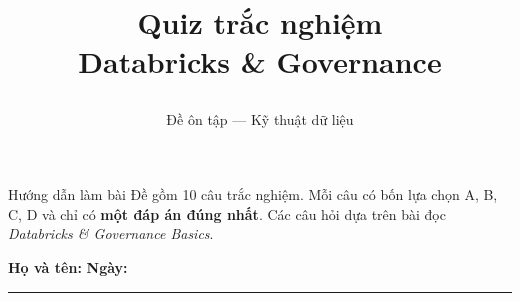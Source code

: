 
\title{\parbox[c][\TitleBlockHeight][c]{0.90\textwidth}{\centering\fontsize{20pt}{24pt}\selectfont\bfseries Quiz trắc nghiệm\\Databricks \& Governance}}
\author{Đề ôn tập --- Kỹ thuật dữ liệu}

\maketitle
\thispagestyle{firstpage}
\vspace{-1em}
\begin{infobox}{Hướng dẫn làm bài}
Đề gồm 10 câu trắc nghiệm. Mỗi câu có bốn lựa chọn A, B, C, D và chỉ có \textbf{một đáp án đúng nhất}. Các câu hỏi dựa trên bài đọc \emph{Databricks \& Governance Basics}.
\end{infobox}
\noindent\textbf{Họ và tên:} \dotfill\quad\textbf{Ngày:} \rule{2.5cm}{0.3pt}
\par\medskip


